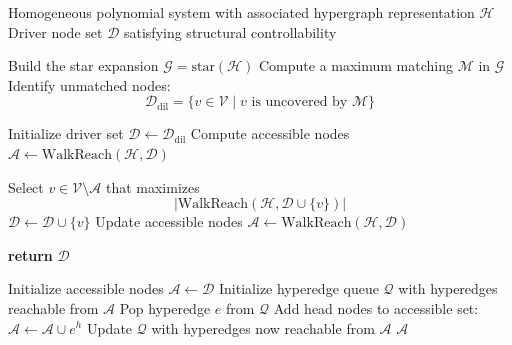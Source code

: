 \documentclass[journal,twoside,web]{ieeecolor}
\newcommand{\As}{\mathcal{A}}
\newcommand{\Ds}{\mathcal{D}}
\newcommand{\Gs}{\mathcal{G}}
\newcommand{\Hs}{\mathcal{H}}
\newcommand{\Qs}{\mathcal{Q}}
\newcommand{\Vs}{\mathcal{V}}
\begin{document}
\begin{algorithm}[t]
\caption{Matching-Augmented Greedy (MaG) Driver Node Selection}
\label{alg:MaG}
\begin{algorithmic}[1]
\Require Homogeneous polynomial system with associated hypergraph representation $\Hs$
\Ensure Driver node set $\Ds$ satisfying structural controllability

\State Build the star expansion $\Gs = \mathrm{star}(\Hs)$
\State Compute a maximum matching $\mathcal{M}$ in $\Gs$
\State Identify unmatched nodes:
\[
\Ds_{\mathrm{dil}} = \{ v \in \Vs \mid v \text{ is uncovered by } \mathcal{M} \}
\]

\State Initialize driver set $\Ds \gets \Ds_{\mathrm{dil}}$
\State Compute accessible nodes $\As \gets \mathrm{WalkReach}(\Hs, \Ds)$

\While{$\As \neq \Vs$}
    \State Select $v \in \Vs \setminus \As$ that maximizes
    \[
    |\mathrm{WalkReach}(\Hs, \Ds \cup \{v\})|
    \]
    \State $\Ds \gets \Ds \cup \{v\}$
    \State Update accessible nodes $\As \gets \mathrm{WalkReach}(\Hs, \Ds)$
\EndWhile

\State \textbf{return} $\Ds$
\State

\Procedure{WalkReach}{$\Hs, \Ds$}
    \State Initialize accessible nodes $\As \gets \Ds$
    \State Initialize hyperedge queue $\Qs$ with hyperedges reachable from $\As$
    \While{$\Qs \neq \emptyset$}
        \State Pop hyperedge $e$ from $\Qs$
        \State Add head nodes to accessible set: $\As \gets \As \cup e^h$
        \State Update $\Qs$ with hyperedges now reachable from $\As$
    \EndWhile
    \State \Return $\As$
\EndProcedure

\end{algorithmic}
\end{algorithm}
\end{document}

